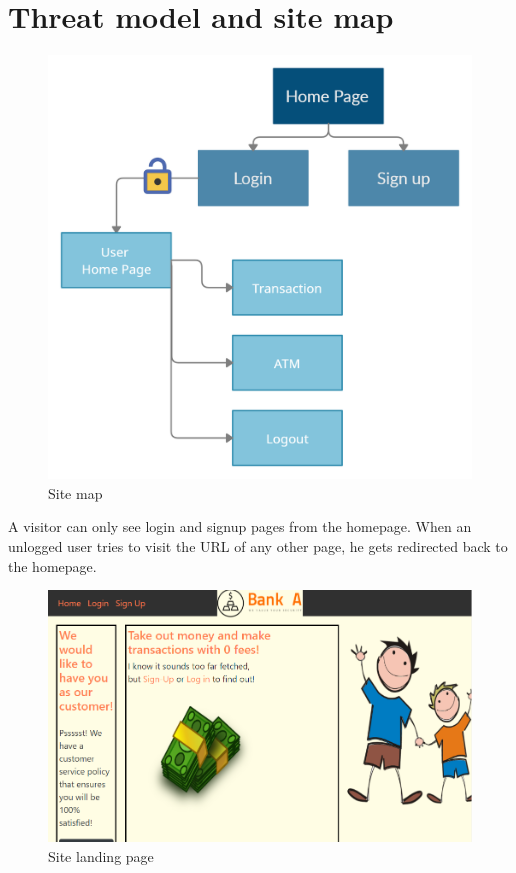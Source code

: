 \chapter{Threat model and site map}\label{kap:Threat model and site map}

\renewcommand{\figurename}{Fig.}


\begin{figure}[H]
    \centering
    \includegraphics[width=\textwidth]{pics/pic1 Site map.png}
    \caption{Site map}
    \label{fig:kap1fig1sitemap}
\end{figure}

A visitor can only see login and signup pages from the homepage. When an unlogged user tries to visit the URL of any other page, he gets redirected back to the homepage.

\begin{figure}[H]
    \centering
    \includegraphics[width=\textwidth]{pics/pic2 home visitor.PNG}
    \caption{Site landing page}
\end{figure}


